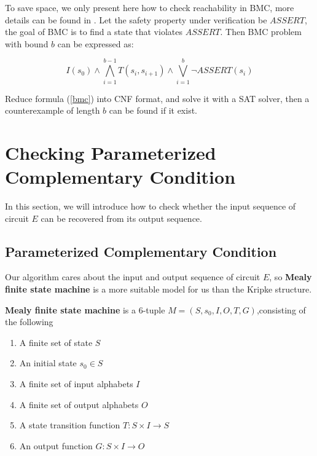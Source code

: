 \documentclass[journal]{IEEEtran}
\begin{document}
To save space,
we only present here how to check reachability in BMC,
more details can be found in \cite{SMCSAT}.
Let the safety property under verification be $ASSERT$,
the goal of BMC is to find a state that violates $ASSERT$.
Then BMC problem with bound $b$ can be expressed as:

\begin{equation}\label{bmc}
I(s_0)\wedge \bigwedge_{i=1}^{b-1} T(s_i,s_{i+1})\wedge \bigvee_{i=1}^{b}\neg ASSERT(s_i)
\end{equation}

Reduce formula (\ref{bmc}) into CNF format,
and solve it with a SAT solver,
then a counterexample of length $b$ can be found if it exist.

\section{Checking Parameterized Complementary Condition}\label{sec_checkUA}

In this section,
we will introduce how to check whether the input sequence of circuit $E$ can be recovered from its output sequence.

\subsection{Parameterized Complementary Condition}

Our algorithm cares about the input and output sequence of circuit $E$,
so \textbf{Mealy finite state machine}\cite{MEALY} is a more suitable model for us than the Kripke structure.

\vspace{0.2cm}

\begin{definition11}\label{MealyFSM}%
\textbf{Mealy finite state machine} is a 6-tuple $M=(S,s_0,I,O,T,G)$,consisting of the following
\begin{enumerate}
\item A finite set of state $S$
\item An initial state $s_0\in S$
\item A finite set of input alphabets $I$
\item A finite set of output alphabets $O$
\item A state transition function $T: S\times I\to S$
\item An output function $G:S\times I\to O$
\end{enumerate}
\end{definition11}
\end{document}
